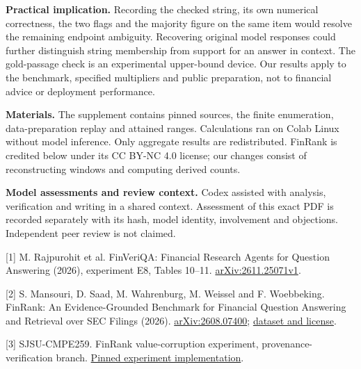 \documentclass[11pt]{article}
\begin{document}
\textbf{Practical implication.} Recording the checked string, its own numerical correctness, the two flags and the majority figure on the same item would resolve the remaining endpoint ambiguity. Recovering original model responses could further distinguish string membership from support for an answer in context. The gold-passage check is an experimental upper-bound device. Our results apply to the benchmark, specified multipliers and public preparation, not to financial advice or deployment performance.

\textbf{Materials.} The supplement contains pinned sources, the finite enumeration, data-preparation replay and attained ranges. Calculations ran on Colab Linux without model inference. Only aggregate results are redistributed. FinRank is credited below under its CC BY-NC 4.0 license; our changes consist of reconstructing windows and computing derived counts.

\textbf{Model assessments and review context.} Codex assisted with analysis, verification and writing in a shared context. Assessment of this exact PDF is recorded separately with its hash, model identity, involvement and objections. Independent peer review is not claimed.

\small
[1] M. Rajpurohit et al. FinVeriQA: Financial Research Agents for Question Answering (2026), experiment E8, Tables 10--11. \href{https://arxiv.org/abs/2611.25071}{arXiv:2611.25071v1}.

[2] S. Mansouri, D. Saad, M. Wahrenburg, M. Weissel and F. Woebbeking. FinRank: An Evidence-Grounded Benchmark for Financial Question Answering and Retrieval over SEC Filings (2026). \href{https://arxiv.org/abs/2608.07400}{arXiv:2608.07400}; \href{https://github.com/datanxt/FinRank/tree/916dc27e77b90e294ea1b3a2cc5b0abcf07392d1}{dataset and license}.

[3] SJSU-CMPE259. FinRank value-corruption experiment, provenance-verification branch. \href{https://github.com/SJSU-CMPE259/AI-Stock-Research-and-Earnings-Assistant/blob/bcd455d5f40d2117381ee6326b18a75e8466b704/ACSESS/finsight/experiments/provenance_verification/scripts/finrank_value_corruption.py}{Pinned experiment implementation}.
\end{document}

